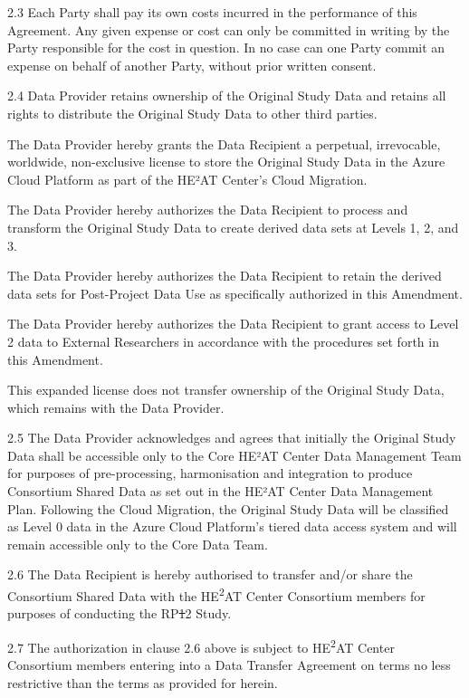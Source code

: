 \documentclass[12pt,letterpaper]{article}
\newcommand{\deleted}[1]{\textcolor{deletecolor}{\sout{#1}}}
\newcommand{\added}[1]{\textcolor{addcolor}{#1}}
\begin{document}
2.3 Each Party shall pay its own costs incurred in the performance of this Agreement. Any given expense or cost can only be committed in writing by the Party responsible for the cost in question. In no case can one Party commit an expense on behalf of another Party, without prior written consent.

2.4 Data Provider retains ownership of the Original Study Data and retains all rights to distribute the Original Study Data to other third parties. 

\added{The Data Provider hereby grants the Data Recipient a perpetual, irrevocable, worldwide, non-exclusive license to store the Original Study Data in the Azure Cloud Platform as part of the HE²AT Center's Cloud Migration.}

\added{The Data Provider hereby authorizes the Data Recipient to process and transform the Original Study Data to create derived data sets at Levels 1, 2, and 3.}

\added{The Data Provider hereby authorizes the Data Recipient to retain the derived data sets for Post-Project Data Use as specifically authorized in this Amendment.}

\added{The Data Provider hereby authorizes the Data Recipient to grant access to Level 2 data to External Researchers in accordance with the procedures set forth in this Amendment.}

\added{This expanded license does not transfer ownership of the Original Study Data, which remains with the Data Provider.}

2.5 The Data Provider acknowledges and agrees that initially the Original Study Data shall be accessible only to the Core \added{HE²AT Center Data Management} Team for purposes of pre-processing, harmonisation and integration to produce Consortium Shared Data as set out in the HE²AT Center Data Management Plan. \added{Following the Cloud Migration, the Original Study Data will be classified as Level 0 data in the Azure Cloud Platform's tiered data access system and will remain accessible only to the Core Data Team.}

2.6 The Data Recipient is hereby authorised to transfer and/or share the Consortium Shared Data with the HE\textsuperscript{2}AT Center Consortium members for purposes of conducting the RP\deleted{1}\added{2} Study.

2.7 The authorization in clause 2.6 above is subject to HE\textsuperscript{2}AT Center Consortium members entering into a Data Transfer Agreement on terms no less restrictive than the terms as provided for herein.
\end{document}
